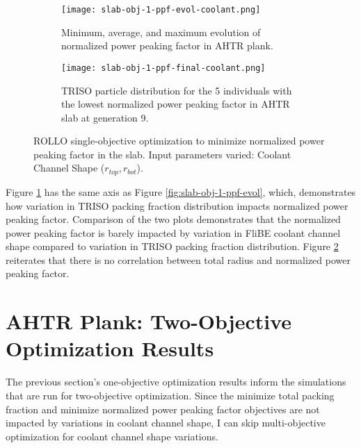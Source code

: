 \begin{figure}[htbp]
    \centering
    \begin{subfigure}{\textwidth}
        \texttt{[image: slab-obj-1-ppf-evol-coolant.png]}
        \caption{Minimum, average, and maximum evolution of normalized power 
        peaking factor in AHTR plank.}
        \label{fig:slab-obj-1-ppf-evol-coolant} 
    \end{subfigure}
    \begin{subfigure}{\textwidth}
        \texttt{[image: slab-obj-1-ppf-final-coolant.png]}
        \caption{TRISO particle distribution for the 5 individuals with the 
        lowest normalized power peaking factor in AHTR slab at generation 9.}
        \label{fig:slab-obj-1-ppf-final-coolant} 
    \end{subfigure}
    \caption{ROLLO single-objective optimization to minimize normalized power 
    peaking factor in the slab. Input parameters varied: Coolant Channel Shape 
    ($r_{top}, r_{bot}$).}
    \label{fig:slab-obj-1-ppf-coolant}
\end{figure}
Figure \ref{fig:slab-obj-1-ppf-evol-coolant} has the same axis as Figure 
\ref{fig:slab-obj-1-ppf-evol}, which, demonstrates how variation in TRISO packing fraction 
distribution impacts normalized power peaking factor. 
Comparison of the two plots demonstrates that the normalized power
peaking factor is barely impacted by variation in FliBE coolant channel shape compared 
to variation in TRISO packing fraction distribution.
Figure \ref{fig:slab-obj-1-ppf-final-coolant} reiterates that there is no correlation 
between total radius and normalized power peaking factor. 

\section{AHTR Plank: Two-Objective Optimization Results}
The previous section's one-objective optimization results inform the simulations that 
are run for two-objective optimization. 
Since the minimize total packing fraction and minimize normalized power peaking factor 
objectives are not impacted by variations in coolant channel shape, I can
skip multi-objective optimization for coolant channel shape variations.  

